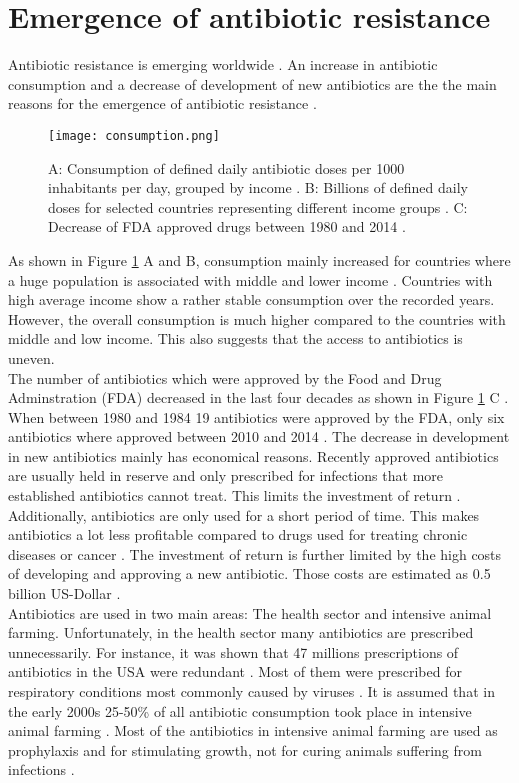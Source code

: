 \section{Emergence of antibiotic resistance}
Antibiotic resistance is emerging worldwide \cite{ventola_antibiotic_2015}. An increase in antibiotic consumption and a decrease of development of new antibiotics are the the main reasons for the emergence of antibiotic resistance \cite{ventola_antibiotic_2015}. 
\begin{figure}
	\texttt{[image: consumption.png]}
	\caption{A: Consumption of defined daily antibiotic doses per 1000 inhabitants per day, grouped by income \cite{klein_global_2018}.  B: Billions of defined daily doses for selected countries representing different income groups \cite{klein_global_2018}. C: Decrease of FDA approved drugs between 1980 and 2014 \cite{ventola_antibiotic_2015}.}
	\label{figure:emergence}
\end{figure}
As shown in Figure \ref{figure:emergence} A and B, consumption mainly increased for countries where a huge population is associated with middle and lower income \cite{klein_global_2018}. Countries with high average income show a rather stable consumption over the recorded years. However, the overall consumption is much higher compared to the countries with middle and low income. This also suggests that the access to antibiotics is uneven.\\
The number of antibiotics which were approved by the Food and Drug  Adminstration (FDA) decreased in the last four decades as shown in Figure \ref{figure:emergence} C \cite{ventola_antibiotic_2015}. When between 1980 and 1984 19 antibiotics were approved by the FDA, only six antibiotics where approved between 2010 and 2014 \cite{ventola_antibiotic_2015}. The decrease in development in new antibiotics mainly has economical reasons. Recently approved antibiotics are usually held in reserve and only prescribed for infections that more established antibiotics cannot treat. This limits the investment of return \cite{fair_antibiotics_2014}. Additionally, antibiotics are only used for a short period of time. This makes antibiotics a lot less profitable compared to drugs used for treating chronic diseases or cancer \cite{fair_antibiotics_2014}. The investment of return is further limited by the high costs of developing and approving a new antibiotic. Those costs are estimated as 0.5 billion US-Dollar \cite{costs}. \\
Antibiotics are used in two main areas: The health sector and intensive animal farming. Unfortunately, in the health sector many antibiotics are prescribed unnecessarily. For instance, it was shown that 47 millions prescriptions of antibiotics in the USA were redundant \cite{noauthor_antibiotic_2019}. Most of them were prescribed for respiratory conditions most commonly caused by viruses \cite{noauthor_antibiotic_2019}. It is assumed that in the early 2000s 25-50\% of all antibiotic consumption took place in intensive animal farming  \cite{palumbi_humans_2001}. Most of the antibiotics in intensive animal farming are used as prophylaxis and for stimulating growth, not for curing animals suffering from infections \cite{palumbi_humans_2001}\cite{zhu_diverse_2013}. \\
